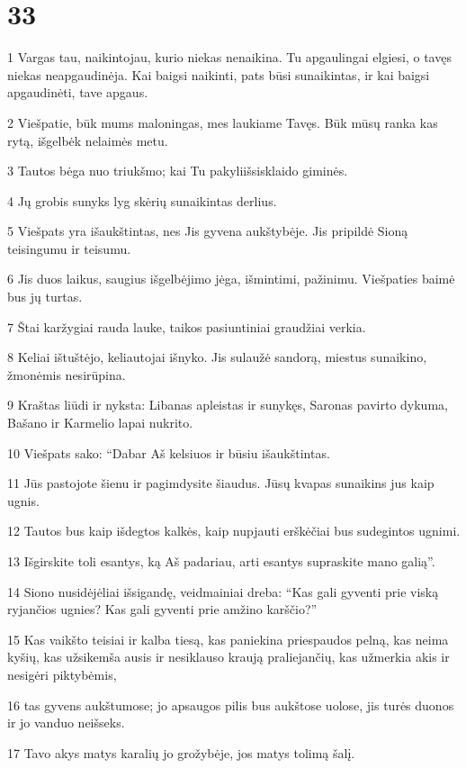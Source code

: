 \chapter{33}


\par 1 Vargas tau, naikintojau, kurio niekas nenaikina. Tu apgaulingai elgiesi, o tavęs niekas neapgaudinėja. Kai baigsi naikinti, pats būsi sunaikintas, ir kai baigsi apgaudinėti, tave apgaus. 
\par 2 Viešpatie, būk mums maloningas, mes laukiame Tavęs. Būk mūsų ranka kas rytą, išgelbėk nelaimės metu. 
\par 3 Tautos bėga nuo triukšmo; kai Tu pakyli­išsisklaido giminės. 
\par 4 Jų grobis sunyks lyg skėrių sunaikintas derlius. 
\par 5 Viešpats yra išaukštintas, nes Jis gyvena aukštybėje. Jis pripildė Sioną teisingumu ir teisumu. 
\par 6 Jis duos laikus, saugius išgelbėjimo jėga, išmintimi, pažinimu. Viešpaties baimė bus jų turtas. 
\par 7 Štai karžygiai rauda lauke, taikos pasiuntiniai graudžiai verkia. 
\par 8 Keliai ištuštėjo, keliautojai išnyko. Jis sulaužė sandorą, miestus sunaikino, žmonėmis nesirūpina. 
\par 9 Kraštas liūdi ir nyksta: Libanas apleistas ir sunykęs, Saronas pavirto dykuma, Bašano ir Karmelio lapai nukrito. 
\par 10 Viešpats sako: “Dabar Aš kelsiuos ir būsiu išaukštintas. 
\par 11 Jūs pastojote šienu ir pagimdysite šiaudus. Jūsų kvapas sunaikins jus kaip ugnis. 
\par 12 Tautos bus kaip išdegtos kalkės, kaip nupjauti erškėčiai bus sudegintos ugnimi. 
\par 13 Išgirskite toli esantys, ką Aš padariau, arti esantys supraskite mano galią”. 
\par 14 Siono nusidėjėliai išsigandę, veidmainiai dreba: “Kas gali gyventi prie viską ryjančios ugnies? Kas gali gyventi prie amžino karščio?” 
\par 15 Kas vaikšto teisiai ir kalba tiesą, kas paniekina priespaudos pelną, kas neima kyšių, kas užsikemša ausis ir nesiklauso kraują praliejančių, kas užmerkia akis ir nesigėri piktybėmis, 
\par 16 tas gyvens aukštumose; jo apsaugos pilis bus aukštose uolose, jis turės duonos ir jo vanduo neišseks. 
\par 17 Tavo akys matys karalių jo grožybėje, jos matys tolimą šalį. 
